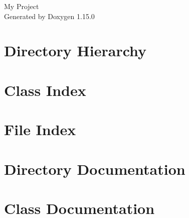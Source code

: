 \documentclass[twoside]{book}
\newcommand{\+}{\discretionary{\mbox{\scriptsize$\hookleftarrow$}}{}{}}
\newcommand{\clearemptydoublepage}{%
    \newpage{\pagestyle{empty}\cleardoublepage}%
  }
\begin{document}
  \raggedbottom
    \hypersetup{pageanchor=false,
                bookmarksnumbered=true,
                pdfencoding=unicode
               }
  \begin{titlepage}
  \vspace*{7cm}
  \begin{center}%
  {\Large My Project}\\
  \vspace*{1cm}
  {\large Generated by Doxygen 1.15.0}\\
  \end{center}
  \end{titlepage}
  \clearemptydoublepage
  \tableofcontents
  \clearemptydoublepage
  \hypersetup{pageanchor=true}










\chapter{Directory Hierarchy}

\chapter{Class Index}

\chapter{File Index}

\chapter{Directory Documentation}




\chapter{Class Documentation}






\end{document}
